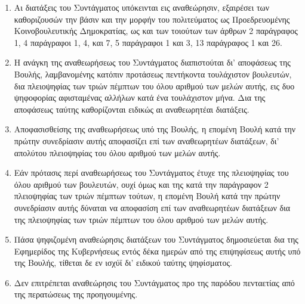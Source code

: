 \documentclass[twoside, a4paper, 10pt]{article}
\begin{document}
\begin{multicols}{2}
\begin{enumerate}
\begin{BigQuote}
\begin{enumerate}
  \item[1.] Αι διατάξεις του Συντάγματος υπόκεινται εις αναθεώρησιν, εξαιρέσει των καθοριζουσών την βάσιν και την μορφήν του πολιτεύματος ως Προεδρευομένης Κοινοβουλευτικής Δημοκρατίας, ως και των τοιούτων των άρθρων 2 παράγραφος 1, 4 παράγραφοι 1, 4, και 7, 5 παράγραφοι 1 και 3, 13 παράγραφος 1 και 26.
  \item[2.] Η ανάγκη της αναθεωρήσεως του Συντάγματος διαπιστούται δι' αποφάσεως της Βουλής, λαμβανομένης κατόπιν προτάσεως πεντήκοντα  τουλάχιστον βουλευτών, δια πλειοψηφίας των τριών πέμπτων του όλου αριθμού των μελών αυτής, εις δυο ψηφοφορίας αφισταμένας αλλήλων κατά ένα τουλάχιστον μήνα. Δια της αποφάσεως ταύτης καθορίζονται ειδικώς αι αναθεωρητέαι διατάξεις.
  \item[3.] Αποφασισθείσης της αναθεωρήσεως  υπό της Βουλής, η επομένη Βουλή κατά την πρώτην συνεδρίασιν αυτής αποφασίζει επί των αναθεωρητέων διατάξεων, δι' απολύτου πλειοψηφίας του όλου αριθμού των μελών αυτής.
  \item[4.] Εάν πρότασις περί αναθεωρήσεως του Συντάγματος έτυχε της πλειοψηφίας του όλου αριθμού των βουλευτών, ουχί όμως και της κατά την παράγραφον 2 πλειοψηφίας των τριών πέμπτων τούτων, η επομένη Βουλή κατά την πρώτην συνεδρίασιν αυτής δύναται να αποφασίση επί των αναθεωρητέων διατάξεων δια της πλειοψηφίας των τριών πέμπτων του όλου αριθμού των μελών αυτής.
  \item[5.] Πάσα ψηφιζομένη αναθεώρησις διατάξεων του Συντάγματος δημοσιεύεται δια της Εφημερίδος της Κυβερνήσεως εντός δέκα ημερών από της επιψηφίσεως αυτής υπό της Βουλής, τίθεται δε εν ισχύϊ δι' ειδικού ταύτης ψηφίσματος.
  \item[6.] Δεν επιτρέπεται  αναθεώρησις του Συντάγματος προ της παρόδου πενταετίας από της περατώσεως της προηγουμένης.
\end{enumerate}


\end{BigQuote}
\end{enumerate}
\end{multicols}
\end{document}
